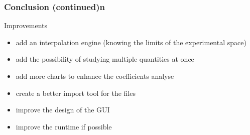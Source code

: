 \documentclass[compress, english, aspectratio=169]{beamer}
\begin{document}
\begin{frame}
\frametitle{Conclusion (continued)n}
\begin{block}{Improvements}
\begin{itemize}
\item add an interpolation engine (knowing the limits of the experimental space)
\item add the possibility of studying multiple quantities at once
\item add more charts to enhance the coefficients analyse
\item create a better import tool for the files
\item improve the design of the GUI
\item improve the runtime if possible
\end{itemize}
\end{block}
\end{frame}
\end{document}
